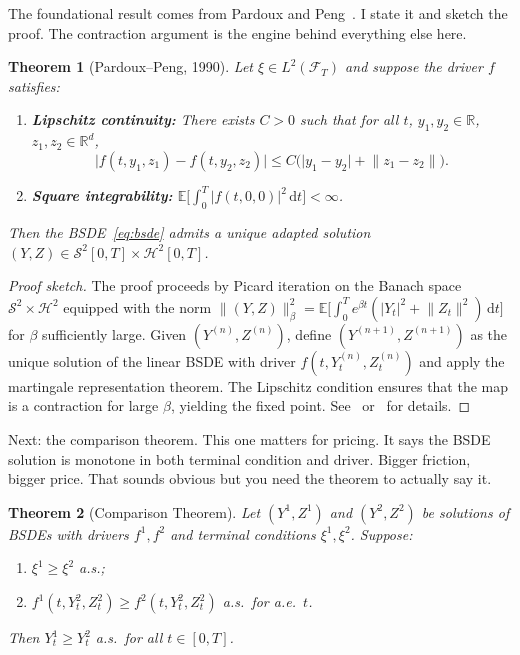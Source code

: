 \documentclass[11pt]{article}
\newtheorem{theorem}{Theorem}[section]
\theoremstyle{definition}
\theoremstyle{remark}
\newcommand{\R}{\mathbb{R}}
\newcommand{\E}{\mathbb{E}}
\newcommand{\F}{\mathcal{F}}
\newcommand{\dt}{\,\mathrm{d}t}
\newcommand{\norm}[1]{\lVert #1 \rVert}
\newcommand{\abs}[1]{\lvert #1 \rvert}
\begin{document}
The foundational result comes from Pardoux and
Peng~\cite{pardoux1990adapted}.
I state it and sketch the proof. The contraction argument is the engine
behind everything else here.

\begin{theorem}[Pardoux--Peng, 1990]\label{thm:existence}
Let $\xi \in L^2(\F_T)$ and suppose the driver $f$ satisfies:
\begin{enumerate}[label=(\roman*)]
  \item \textbf{Lipschitz continuity:} There exists $C > 0$ such that for all
  $t$, $y_1, y_2 \in \R$, $z_1, z_2 \in \R^d$,
  \[
    \abs{f(t, y_1, z_1) - f(t, y_2, z_2)}
    \le C\bigl(\abs{y_1 - y_2} + \norm{z_1 - z_2}\bigr).
  \]
  \item \textbf{Square integrability:}
  $\E\bigl[\int_0^T \abs{f(t,0,0)}^2 \dt\bigr] < \infty$.
\end{enumerate}
Then the BSDE~\eqref{eq:bsde} admits a unique adapted solution
$(Y, Z) \in \mathcal{S}^2[0,T] \times \mathcal{H}^2[0,T]$.
\end{theorem}

\begin{proof}[Proof sketch]
The proof proceeds by Picard iteration on the Banach space
$\mathcal{S}^2 \times \mathcal{H}^2$ equipped with the norm
$\norm{(Y,Z)}_\beta^2 = \E\bigl[\int_0^T e^{\beta t}(|Y_t|^2 + \norm{Z_t}^2)\dt\bigr]$
for $\beta$ sufficiently large.  Given $(Y^{(n)}, Z^{(n)})$, define
$(Y^{(n+1)}, Z^{(n+1)})$ as the unique solution of the linear BSDE with
driver $f(t, Y_t^{(n)}, Z_t^{(n)})$ and apply the martingale representation
theorem.  The Lipschitz condition ensures that the map is a contraction for
large $\beta$, yielding the fixed point.  See~\cite{pardoux1990adapted}
or~\cite[Chapter~4]{zhang2017backward} for details.
\end{proof}

Next: the comparison theorem.
This one matters for pricing. It says the BSDE solution is monotone in
both terminal condition and driver.
Bigger friction, bigger price.
That sounds obvious but you need the theorem to actually say it.

\begin{theorem}[Comparison Theorem]\label{thm:comparison}
Let $(Y^1, Z^1)$ and $(Y^2, Z^2)$ be solutions of BSDEs with drivers
$f^1, f^2$ and terminal conditions $\xi^1, \xi^2$.  Suppose:
\begin{enumerate}[label=(\roman*)]
  \item $\xi^1 \ge \xi^2$ a.s.;
  \item $f^1(t, Y_t^2, Z_t^2) \ge f^2(t, Y_t^2, Z_t^2)$ a.s.\ for a.e.\ $t$.
\end{enumerate}
Then $Y_t^1 \ge Y_t^2$ a.s.\ for all $t \in [0,T]$.
\end{theorem}
\end{document}
